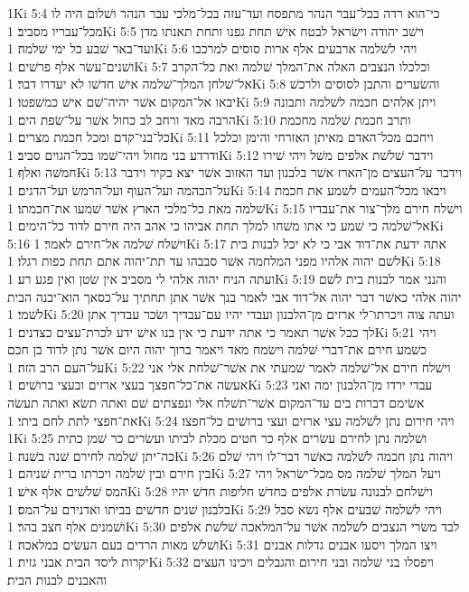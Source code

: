 1Ki 5:4  כי־הוא רדה בכל־עבר הנהר מתפסח ועד־עזה בכל־מלכי עבר הנהר ושׁלום היה לו מכל־עבריו מסביב׃
1Ki 5:5  וישׁב יהודה וישׂראל לבטח אישׁ תחת גפנו ותחת תאנתו מדן ועד־באר שׁבע כל ימי שׁלמה׃
1Ki 5:6  ויהי לשׁלמה ארבעים אלף ארות סוסים למרכבו ושׁנים־עשׂר אלף פרשׁים׃
1Ki 5:7  וכלכלו הנצבים האלה את־המלך שׁלמה ואת כל־הקרב אל־שׁלחן המלך־שׁלמה אישׁ חדשׁו לא יעדרו דבר׃
1Ki 5:8  והשׂערים והתבן לסוסים ולרכשׁ יבאו אל־המקום אשׁר יהיה־שׁם אישׁ כמשׁפטו׃
1Ki 5:9  ויתן אלהים חכמה לשׁלמה ותבונה הרבה מאד ורחב לב כחול אשׁר על־שׂפת הים׃
1Ki 5:10  ותרב חכמת שׁלמה מחכמת כל־בני־קדם ומכל חכמת מצרים׃
1Ki 5:11  ויחכם מכל־האדם מאיתן האזרחי והימן וכלכל ודרדע בני מחול ויהי־שׁמו בכל־הגוים סביב׃
1Ki 5:12  וידבר שׁלשׁת אלפים משׁל ויהי שׁירו חמשׁה ואלף׃
1Ki 5:13  וידבר על־העצים מן־הארז אשׁר בלבנון ועד האזוב אשׁר יצא בקיר וידבר על־הבהמה ועל־העוף ועל־הרמשׂ ועל־הדגים׃
1Ki 5:14  ויבאו מכל־העמים לשׁמע את חכמת שׁלמה מאת כל־מלכי הארץ אשׁר שׁמעו את־חכמתו׃
1Ki 5:15  וישׁלח חירם מלך־צור את־עבדיו אל־שׁלמה כי שׁמע כי אתו משׁחו למלך תחת אביהו כי אהב היה חירם לדוד כל־הימים׃
1Ki 5:16  וישׁלח שׁלמה אל־חירם לאמר׃
1Ki 5:17  אתה ידעת את־דוד אבי כי לא יכל לבנות בית לשׁם יהוה אלהיו מפני המלחמה אשׁר סבבהו עד תת־יהוה אתם תחת כפות רגלו׃
1Ki 5:18  ועתה הניח יהוה אלהי לי מסביב אין שׂטן ואין פגע רע׃
1Ki 5:19  והנני אמר לבנות בית לשׁם יהוה אלהי כאשׁר דבר יהוה אל־דוד אבי לאמר בנך אשׁר אתן תחתיך על־כסאך הוא־יבנה הבית לשׁמי׃
1Ki 5:20  ועתה צוה ויכרתו־לי ארזים מן־הלבנון ועבדי יהיו עם־עבדיך ושׂכר עבדיך אתן לך ככל אשׁר תאמר כי אתה ידעת כי אין בנו אישׁ ידע לכרת־עצים כצדנים׃
1Ki 5:21  ויהי כשׁמע חירם את־דברי שׁלמה וישׂמח מאד ויאמר ברוך יהוה היום אשׁר נתן לדוד בן חכם על־העם הרב הזה׃
1Ki 5:22  וישׁלח חירם אל־שׁלמה לאמר שׁמעתי את אשׁר־שׁלחת אלי אני אעשׂה את־כל־חפצך בעצי ארזים ובעצי ברושׁים׃
1Ki 5:23  עבדי ירדו מן־הלבנון ימה ואני אשׂימם דברות בים עד־המקום אשׁר־תשׁלח אלי ונפצתים שׁם ואתה תשׂא ואתה תעשׂה את־חפצי לתת לחם ביתי׃
1Ki 5:24  ויהי חירום נתן לשׁלמה עצי ארזים ועצי ברושׁים כל־חפצו׃
1Ki 5:25  ושׁלמה נתן לחירם עשׂרים אלף כר חטים מכלת לביתו ועשׂרים כר שׁמן כתית כה־יתן שׁלמה לחירם שׁנה בשׁנה׃
1Ki 5:26  ויהוה נתן חכמה לשׁלמה כאשׁר דבר־לו ויהי שׁלם בין חירם ובין שׁלמה ויכרתו ברית שׁניהם׃
1Ki 5:27  ויעל המלך שׁלמה מס מכל־ישׂראל ויהי המס שׁלשׁים אלף אישׁ׃
1Ki 5:28  וישׁלחם לבנונה עשׂרת אלפים בחדשׁ חליפות חדשׁ יהיו בלבנון שׁנים חדשׁים בביתו ואדנירם על־המס׃
1Ki 5:29  ויהי לשׁלמה שׁבעים אלף נשׂא סבל ושׁמנים אלף חצב בהר׃
1Ki 5:30  לבד משׂרי הנצבים לשׁלמה אשׁר על־המלאכה שׁלשׁת אלפים ושׁלשׁ מאות הרדים בעם העשׂים במלאכה׃
1Ki 5:31  ויצו המלך ויסעו אבנים גדלות אבנים יקרות ליסד הבית אבני גזית׃
1Ki 5:32  ויפסלו בני שׁלמה ובני חירום והגבלים ויכינו העצים והאבנים לבנות הבית׃
